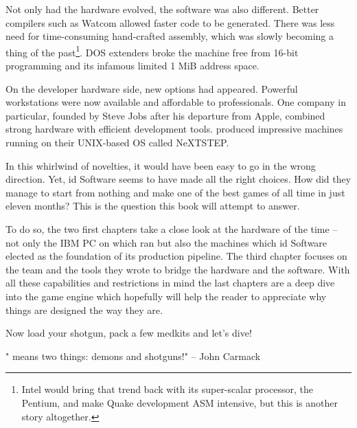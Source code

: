  Not only had the hardware evolved, the software was also different. Better compilers such as Watcom allowed faster code to be generated. There was less need for time-consuming hand-crafted assembly, which was slowly becoming a thing of the past\footnote{Intel would bring that trend back with its super-scalar processor, the Pentium, and make Quake development ASM intensive, but this is another story altogether.}. DOS extenders broke the machine free from 16-bit programming and its infamous limited 1 MiB address space.\\
 \par
 On the developer hardware side, new options had appeared. Powerful workstations were now available and affordable to professionals. One company in particular, founded by Steve Jobs after his departure from Apple, combined strong hardware with efficient development tools. \NeXT produced impressive machines running on their UNIX-based OS called NeXTSTEP.\\%
 \par
 In this whirlwind of novelties, it would have been easy to go in the wrong direction. Yet, id Software seems to have made all the right choices. How did they manage to start from nothing and make one of the best games of all time in just eleven months? This is the question this book will attempt to answer.\\
 \par
 To do so, the two first chapters take a close look at the hardware of the time -- not only the IBM PC on which \doom{} ran but also the \NeXT machines which id Software elected as the foundation of its production pipeline. The third chapter focuses on the team and the tools they wrote to bridge the hardware and the software. With all these capabilities and restrictions in mind the last chapters are a deep dive into the game engine which hopefully will help the reader to appreciate why things are designed the way they are.\\
\par
Now load your shotgun, pack a few medkits and let's dive!\\
\par
\centering "\doom{} means two things: demons and shotguns!" -- John Carmack

